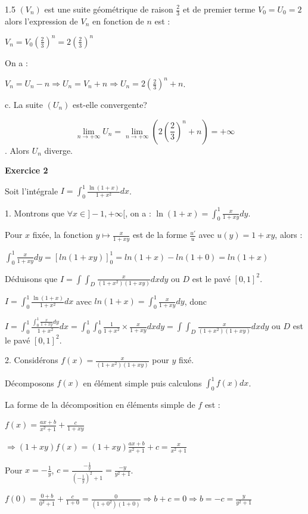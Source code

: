 \documentclass[12pt]{article}
\begin{document}
\begin{spacing}{1.5}
$(V_n)$ est une suite géométrique de raison $\frac{2}{3}$ et de premier terme $V_0=U_0=2$ alors l'expression de $V_n$ en fonction de $n$ est :

$V_n=V_0(\frac{2}{3})^n=2(\frac{2}{3})^n$

On a :

$V_n =U_n-n\Rightarrow U_n =V_n+n\Rightarrow U_n = 2(\frac{2}{3})^n + n$.


c. La suite $(U_n)$ est-elle convergente?

\[\lim_{n\to +\infty}U_n = \lim_{n\to +\infty}(2(\frac{2}{3})^n + n)=+\infty\]. Alors $U_n$ diverge.

\medskip
\textbf{Exercice 2}

Soit l'intégrale $I=\int_{0}^{1}\frac{\ln(1 + x)}{1 + x^2}dx$.

1. Montrons que $\forall {x\in ]-1,+\infty[}$, on a : $\ln(1+x) = \int_{0}^{1}\frac{x}{1 + xy}dy$.

Pour $x$ fixée, la fonction $y\longmapsto \frac{x}{1 + xy}$ est de la forme $\frac{u'}{u}$ avec $u(y)=1+xy$, alors : 

$\int_{0}^{1}\frac{x}{1 + xy}dy=[ln(1+xy)]_0^1=ln(1+x)-ln(1+0)=ln(1+x)$


Déduisons que $I = \int\int_D\frac{x}{(1+x^2)(1+xy)}dxdy$ ou  $D$ est le pavé $[0,1]^2$.


$I=\int_{0}^{1}\frac{\ln(1 + x)}{1 + x^2}dx$ avec $ln(1+x)=\int_{0}^{1}\frac{x}{1 + xy}dy$, donc 

$I=\int_{0}^{1}\frac{\int_{0}^{1}\frac{x}{1 + xy}dy}{1 + x^2}dx=\int_{0}^{1}\int_{0}^{1}\frac{1}{1 + x^2}\times\frac{x}{1 + xy}dxdy=\int\int_D\frac{x}{(1+x^2)(1+xy)}dxdy$ ou  $D$ est le pavé $[0,1]^2$.


2. Considérons $f(x)= \frac{x}{(1+x^2)(1+xy)}$ pour $y$ fixé.

Décomposons $f(x)$ en élément simple puis calculons $\int_{0}^{1}f(x)dx$.

La forme de la décomposition en éléments simple de $f$ est :

$f(x)=\frac{ax+b}{x^2+1}+\frac{c}{1+xy}$

$\Rightarrow (1+xy)f(x)=(1+xy)\frac{ax+b}{x^2+1}+c=\frac{x}{x^2+1}$

Pour $x=-\frac{1}{y}$, $c=\frac{-\frac{1}{y}}{(-\frac{1}{y})^2+1}=\frac{-y}{y^2+1}$.

$f(0)=\frac{0+b}{0^2+1}+\frac{c}{1+0}=\frac{0}{(1+0^2)(1+0)}\Longrightarrow b+c=0\Longrightarrow b=-c=\frac{y}{y^2+1}$


\end{spacing}
\end{document}
